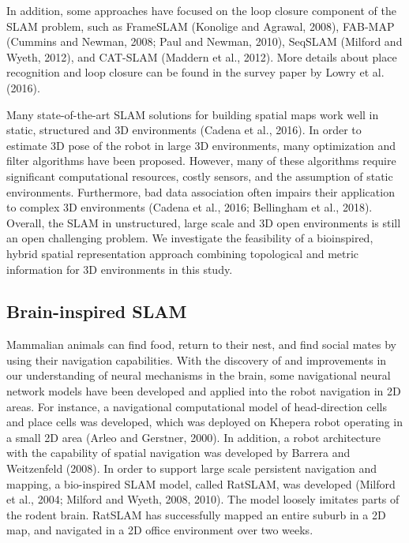 In addition, some approaches have focused on the loop closure component of the SLAM problem, such as FrameSLAM (Konolige and Agrawal, 2008), FAB-MAP (Cummins and Newman, 2008; Paul and Newman, 2010), SeqSLAM (Milford and Wyeth, 2012), and CAT-SLAM (Maddern et al., 2012). 
More details about place recognition and loop closure can be found in the survey paper by Lowry et al. (2016).


Many state-of-the-art SLAM solutions for building spatial maps work well in static, structured and 3D environments (Cadena et al., 2016). 
In order to estimate 3D pose of the robot in large 3D environments, many optimization and filter algorithms have been proposed. 
However, many of these algorithms require significant computational resources, costly sensors, and the assumption of static environments. 
Furthermore, bad data association often impairs their application to complex 3D environments (Cadena et al., 2016; Bellingham et al., 2018). 
Overall, the SLAM in unstructured, large scale and 3D open environments is still an open challenging problem. We investigate the feasibility of a bioinspired, hybrid spatial representation approach combining topological and metric information for 3D environments in this study.




\subsection{Brain-inspired SLAM}
\hspace{1pc}Mammalian animals can find food, return to their nest, and find social mates by using their navigation capabilities. 
With the discovery of and improvements in our understanding of neural mechanisms in the brain, some navigational neural network models have been developed and applied into the robot navigation in 2D areas. 
For instance, a navigational computational model of head-direction cells and place cells was developed, which was deployed on Khepera robot operating in a small 2D area (Arleo and Gerstner, 2000). 
In addition, a robot architecture with the capability of spatial navigation was developed by Barrera and Weitzenfeld (2008). 
In order to support large scale persistent navigation and mapping, a bio-inspired SLAM model, called RatSLAM, was developed (Milford et al., 2004; Milford and Wyeth, 2008, 2010). 
The model loosely imitates parts of the rodent brain. RatSLAM has successfully mapped an entire suburb in a 2D map, and navigated in a 2D office environment over two weeks.


